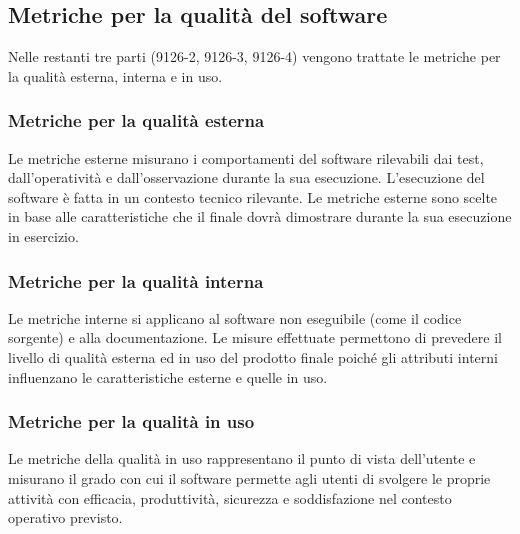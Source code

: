 \documentclass[PianoDiQualifica.tex]{subfiles}
\begin{document}
\subsection{Metriche per la qualità del software}
Nelle restanti tre parti (9126-2, 9126-3, 9126-4) vengono trattate le metriche per la qualità esterna, interna e in uso.

\subsubsection{Metriche per la qualità esterna}
Le metriche esterne misurano i comportamenti del software rilevabili dai test, dall’operatività e dall’osservazione durante la sua esecuzione.
L’esecuzione del software è fatta in un contesto tecnico rilevante.
Le metriche esterne sono scelte in base alle caratteristiche che il 
finale dovrà dimostrare durante la sua esecuzione in esercizio.

\subsubsection{Metriche per la qualità interna}
Le metriche interne si applicano al software non eseguibile (come il codice sorgente) e alla documentazione. Le misure effettuate permettono di prevedere il livello di qualità esterna ed in uso del prodotto finale poiché gli attributi interni influenzano le caratteristiche esterne e quelle in uso.

\subsubsection{Metriche per la qualità in uso}
Le metriche della qualità in uso rappresentano il punto di vista dell'utente e misurano il grado con cui il software permette agli utenti di svolgere le proprie attività con efficacia, produttività, sicurezza e soddisfazione nel contesto operativo previsto.
\end{document}
